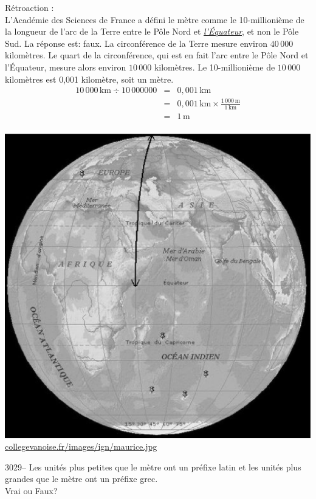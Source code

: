 \documentclass[letterpaper, 12pt]{article}
\begin{document}
R\'etroaction :\\
L'Acad\'emie des Sciences de France a d\'efini le m\`etre comme le 10-millioni\`eme de la longueur de l'arc de la Terre entre le P\^ole Nord et \emph{\underline{l'\'Equateur}}, et non le P\^ole Sud. La r\'eponse est: faux. La circonf\'erence de la Terre mesure environ $40\,000$ kilom\`etres. Le quart de la circonf\'erence, qui est en fait l'arc entre le P\^ole Nord et l'\'Equateur, mesure alors environ $10\,000$ kilom\`etres. Le 10-millioni\`eme de $10\,000$ kilom\`etres est 0,001 kilom\`etre, soit un m\`etre.
\begin{eqnarray*}
10\,000\,\text{km} \div 10\,000 000 &=& 0,001\,\text{km}\\
&=& 0,001\,\text{km} \times \frac{1\,000\,\text{m}}{1\,\text{km}}\\
&=& 1\,\text{m}\\
\end{eqnarray*}
\begin{center}
\includegraphics[scale=0.25]{terre.eps}\\
\href{http://collegevanoise.fr/images/ign/maurice.jpg}{collegevanoise.fr/images/ign/maurice.jpg}\\[5mm]
\end{center}



3029-- Les unit\'es plus petites que le m\`etre ont un pr\'efixe latin et les unit\'es plus grandes que le m\`etre ont un pr\'efixe grec.\\
Vrai ou Faux?\\
\end{document}

